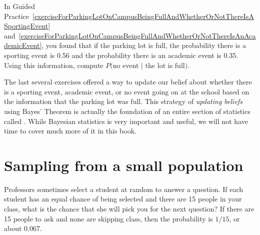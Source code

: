 \begin{exercisewrap}
\begin{nexercise} \label{exerciseForParkingLotOnCampusBeingFullAndWhetherOrNotThereIsNoEvent}
In Guided Practice~\ref{exerciseForParkingLotOnCampusBeingFullAndWhetherOrNotThereIsASportingEvent} and~\ref{exerciseForParkingLotOnCampusBeingFullAndWhetherOrNotThereIsAnAcademicEvent}, you found that if the parking lot is full, the probability there is a sporting event is 0.56 and the probability there is an academic event is 0.35. Using this information, compute $P($no event $|$ the lot is full$)$.\footnotemark
\end{nexercise}
\end{exercisewrap}

The last several exercises offered a way to update our belief about whether there is a sporting event, academic event, or no event going on at the school based on the information that the parking lot was full. This strategy of \emph{updating beliefs} using Bayes' Theorem is actually the foundation of an entire section of statistics called . While Bayesian statistics is very important and useful, we will not have time to cover much more of it in this book.




\section{Sampling from a small population}
\label{smallPop}

\begin{examplewrap}
\begin{nexample}{Professors sometimes select a student at random to answer a question. If each student has an equal chance of being selected and there are 15 people in your class, what is the chance that she will pick you for the next question?}
If there are 15 people to ask and none are skipping class, then the probability is $1/15$, or about $0.067$.
\end{nexample}
\end{examplewrap}

